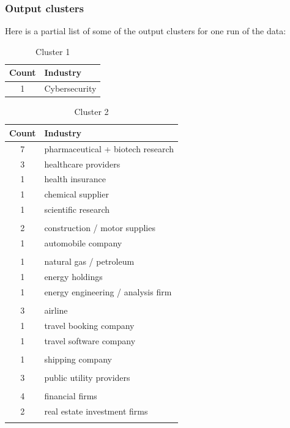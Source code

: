 \documentclass[final]{article}
\begin{document}
\subsubsection{Output clusters}

Here is a partial list of some of the output clusters for one run of
the data:

\begin{table}[H]
\centering
\caption{Cluster 1}
\label{c1}
\begin{tabular}{@{}cl@{}}
\toprule
Count & Industry  \\ \midrule
1 & Cybersecurity \\
\bottomrule
\end{tabular}
\end{table}

\begin{table}[H]
\centering
\caption{Cluster 2}
\label{c2}
\begin{tabular}{@{}cl@{}}
  \toprule
  Count & Industry  \\ \midrule
  7 & pharmaceutical + biotech research \\
  3 & healthcare providers \\
  1 & health insurance \\
  1 & chemical supplier \\
  1 & scientific research \\
        & \\
  2 & construction / motor supplies \\
  1 & automobile company \\
        & \\
  1 & natural gas / petroleum \\
  1 & energy holdings \\
  1 & energy engineering / analysis firm \\
        & \\
  3 & airline \\
  1 & travel booking company \\
  1 & travel software company \\
        & \\
  1 & shipping company \\
        & \\
  3 & public utility providers \\
        & \\
  4 & financial firms \\
  2 & real estate investment firms \\
        & \\

\end{tabular}
\end{table}
\end{document}

